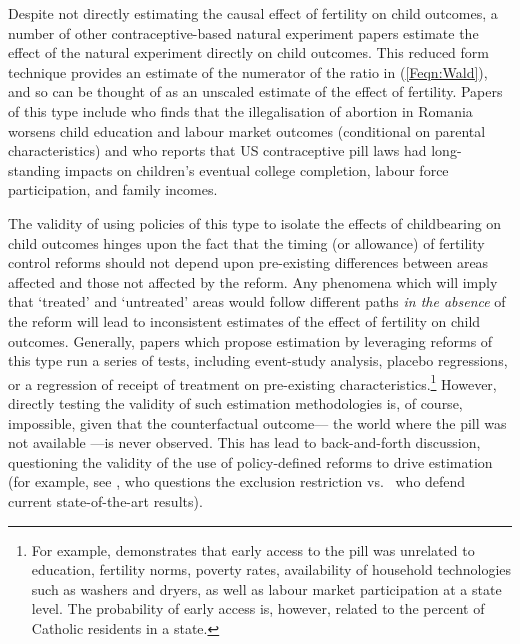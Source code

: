 Despite not directly estimating the causal effect of fertility on child 
outcomes, a number of other contraceptive-based natural experiment papers
estimate the effect of the natural experiment directly on child outcomes.
This reduced form technique provides an estimate of the numerator of the ratio
in (\ref{Feqn:Wald}), and so can be thought of as an unscaled estimate of
the effect of fertility.  Papers of this type include \citet{PopEleches2006} 
who finds that the illegalisation of abortion in Romania worsens child 
education and labour market outcomes (conditional on parental characteristics)
and \citet{Bailey2013} who reports that US contraceptive pill laws had long-%
standing impacts on children's eventual college completion, labour force 
participation, and family incomes.

The validity of using policies of this type to isolate the effects of 
childbearing on child outcomes hinges upon the fact that the timing (or
allowance) of fertility control reforms should not depend upon pre-existing
differences between areas affected and those not affected by the reform. Any
phenomena which will imply that `treated' and `untreated' areas would follow
different paths \emph{in the absence} of the reform will lead to inconsistent
estimates of the effect of fertility on child outcomes.  Generally, papers
which propose estimation by leveraging reforms of this type run a series of
tests, including event-study analysis, placebo regressions, or a regression
of receipt of treatment on pre-existing characteristics.\footnote{For example,
\citet{Bailey2006} demonstrates that early access to the pill was unrelated
to education, fertility norms, poverty rates, availability of household 
technologies such as washers and dryers, as well as labour market participation
at a state level.  The probability of early access is, however, related to the
percent of Catholic residents in a state.}  However, directly testing the
validity of such estimation methodologies is, of course, impossible, given
that the counterfactual outcome--- the world where the pill was not available%
---is never observed.  This has lead to back-and-forth discussion, questioning 
the validity of the use of policy-defined reforms to drive estimation (for 
example, see \citet{Joyce2013}, who questions the exclusion restriction vs.\ 
\citet{Baileyetal2013} who defend current state-of-the-art results). 


